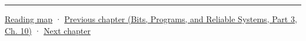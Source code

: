 \begin{center}\rule{0.5\linewidth}{0.5pt}\end{center}

\hyperref[volume-reading-map]{Reading map} · \href{../01-Bits-Programs-and-Reliable-Systems-P03/main.pdf\#nameddest=01-foundations-i-ch012-commands-async-work-and-resource-lifetimes}{Previous chapter (Bits, Programs, and Reliable Systems, Part 3, Ch. 10)} · \hyperref[01-foundations-i-ch014-submit-synchronize-and-retire-gpu-work]{Next chapter}

